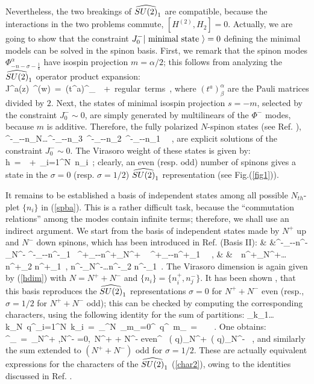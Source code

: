 Nevertheless, the two breakings of $\su2$ are compatible, because the
interactions in the two problems commute, $[H^{(2)},H_2]=0$.
Actually, we are going to show that the 
constraint 
$J^-_0 \vert {\rm \ minimal \ state\ } \rangle =0$ defining 
the minimal models can be solved in the spinon basis.
First, we remark that the spinon modes 
$\Phi^{\alpha}_{-n-\sigma -\frac{1}{4}}$ have isospin
projection $m= \alpha/2$; this follows from analyzing the 
$\su2$ operator product expansion:
\beq
J^a(z)\ \Phi^{\alpha}(w)\ =\ \left(t^a\right)^{\alpha}_{\beta}\
\ +\ {\rm regular\ terms}\ ,
\eeq
where $\left(t^a\right)^{\alpha}_{\beta}$ are the Pauli matrices
divided by $2$.
Next, the states of minimal isospin projection $s=-m$, selected by the
constraint $J^-_0 \sim 0$, are simply generated by multilinears of the 
$\Phi^-$ modes, because $m$ is additive. Therefore, the
fully polarized $N$-spinon states (see Ref. \cite{bls}), 
\beq
\Phi^-_{--n_N}\dots\Phi^-_{--n_3}\
\Phi^-_{--n_2}\ \Phi^-_{--n_1}\ \vert
\Omega\rangle\ , 
\label{spba}
\eeq
are explicit solutions of the constraint
$J^-_0 \sim 0$. The Virasoro weight of these states is given by:
\beq
h\ =\ \frac{N^2}{4}\ +\ \sum_{i=1}^N\ n_i\ ;
\label{hdim}
\eeq
clearly, an even (resp. odd) number of spinons gives a 
state in the $\sigma=0$ (resp. $\sigma=1/2$) $\su2$ representation
(see Fig.(\ref{fig1})).

It remains to be established a basis of independent states among 
all possible $N_{th}$-plet $\{n_i \}$ in (\ref{spba}). This is
a rather difficult task, because the ``commutation relations''
among the modes contain infinite terms; therefore, we shall use 
an indirect argument. We start from the basis of independent 
states made by $N^+$ up and $N^-$ down spinons, which has been
introduced in Ref. \cite{bls} (Basis II):
\barr
& &\Phi^-_{--n^-_{N^-}}\cdots
\Phi^-_{--n^-_1 }\
\Phi^+_{--n^+_{N^+} }\ \cdots
\Phi^+_{-\frac{1}{4}-n^+_1}\ \vert
\Omega\rangle\ , \nl
& &\ \ n^+_{N^+}\ge\dots\ge n^+_2 \ge n^+_1\ ,
\qquad n^-_{N^-}\ge\dots\ge n^-_2 \ge n^-_1\ge 0\ .
\label{bastwo}
\earr
The Virasoro dimension is again given by (\ref{hdim}) with
$N=N^+ + N^- $ and $\{n_i\}=\{n^+_i ,n^-_j \}$. It has been shown 
\cite{bls}, that this basis reproduces the $\su2$ representations 
$\sigma=0$ for $N^+ + N^-$ even (resp., $\sigma=1/2$ for $N^+ + N^-$ odd);
this can be checked by computing the corresponding characters,
using the following identity for the sum of partitions:
\beq
\sum_{k_1\geq \dots k_N\geq 0}\ q^{\sum_{i=1}^{N}\ k_i}\ =\
\prod_{}^N\ \sum_{m_{\ell}=0}^{\infty}\ q^{\ell\ m_{\ell}}\ =\
\ \equiv\ 
\ .
\eeq
One obtains:
\beq
\chi^{\su2}_{\sigma=0}\ =\ 
\sum_{N^+ ,N^- =0,\ N^+ + N^- {\rm even}}^{\infty}\
{\left( q\right)_{N^+}\  \left( q\right)_{N^-}} \ ,
\eeq
and similarly the sum extended to $(N^+ + N^-)$ odd for 
$\sigma =1/2$. These are actually equivalent expressions for 
the characters of the $\su2$ \reps (\ref{char2}), owing to the
identities discussed in Ref. \cite{melzer}.

